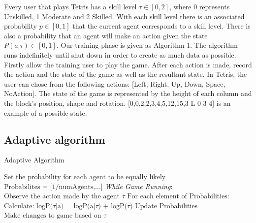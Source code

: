 \documentclass[11pt]{article}
\begin{document}
Every user that plays Tetris has a skill level $\tau \in [0,2]$, where 0 represents Unskilled, 1 Moderate and 2 Skilled. With each skill level there is an associated probability $p \in [0,1]$ that the current agent corresponds to a skill level. There is also a probability that an agent will make an action given the state $P(a | \tau ) \in [0,1]$. Our training phase is given as Algorithm 1. The algorithm runs indefinitely until shut down in order to create as much data as possible. Firstly allow the training user to play the game. After each action is made, record the action and the state of the game as well as the resultant state. In Tetris, the user can chose from the following actions: [Left, Right, Up, Down, Space, NoAction]. The state of the game is represented by the height of each column and the block's position, shape and rotation. [0,0,2,2,3,4,5,12,15,3 L 0 3 4] is an example of a possible state. 



\clearpage
\subsection{    Adaptive algorithm}
\begin{algorithm}
\caption{Adaptive Algorithm}\label{euclid}
\begin{algorithmic}[1]
\State $\text{Set the probability for each agent}$
\State $\text{to be equally likely}$
\State $\text{Probabilites = [1/numAgents,...]}$
\BState \emph{While Game Running}:
\State $\text{Observe the action made by the agent } \tau $
\State $\text{For each element of Probabilities:}$
\State $\text{Calculate: logP(} \tau | \text{a) = logP(a} | \tau \text{) + logP(} \tau )$
\State $\text{Update Probabilities}$
\State $\text{Make changes to game based on } \tau $
\EndIf
\EndProcedure
\end{algorithmic}
\end{algorithm}
\end{document}
